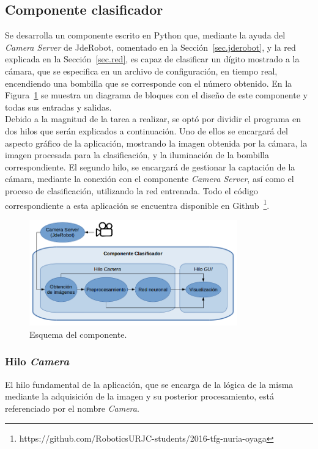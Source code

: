 \subsection{Componente clasificador} \label{sec.componente}
Se desarrolla un componente escrito en Python que, mediante la ayuda del \textit{Camera Server} de JdeRobot, comentado en la Sección~\ref{sec.jderobot},  y la red explicada en la Sección~\ref{sec.red}, es capaz de clasificar un dígito mostrado a la cámara, que se especifica en un archivo de configuración, en tiempo real, encendiendo una bombilla que se corresponde con el número obtenido. En la Figura~\ref{fig.componente} se muestra un diagrama de bloques con el diseño de este componente y todas sus entradas y salidas.\\
	
Debido a la magnitud de la tarea a realizar, se optó por dividir el programa en dos hilos que serán explicados a continuación. Uno de ellos se encargará del aspecto gráfico de la aplicación, mostrando la imagen obtenida por la cámara, la imagen procesada para la clasificación, y la iluminación de la bombilla correspondiente. El segundo hilo, se encargará de gestionar la captación de la cámara, mediante la conexión con el componente \textit{Camera Server}, así como el proceso de clasificación, utilizando la red entrenada. Todo el código correspondiente a esta aplicación se encuentra disponible en Github~\footnote{https://github.com/RoboticsURJC-students/2016-tfg-nuria-oyaga}.

\begin{figure}[H]
	\centering
	\includegraphics[width=0.8\textwidth]{figures/esquemaComponente}
	\caption{Esquema del componente.}
	\label{fig.componente}
\end{figure}

\subsubsection{Hilo \textit{Camera}} \label{sec.camara}
El hilo fundamental de la aplicación, que se encarga de la lógica de la misma mediante la adquisición de la imagen y su posterior procesamiento, está referenciado por el nombre \textit{Camera}.\\

